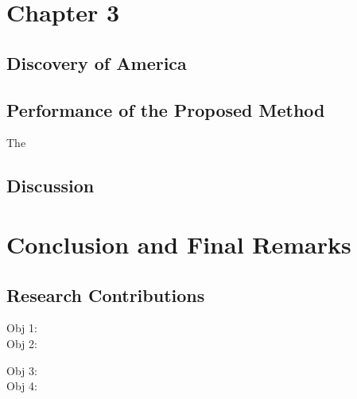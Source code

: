 \documentclass[11pt,a4paper,openright]{book}
\newcommand{\blankpage}{\newpage This page intentionally left blank.}
\theoremstyle{plain}
\theoremstyle{definition}
\begin{document}
\chapter{Chapter 3}\label{ch-ga-eoc}

\lipsum[2]

\section{Discovery of America}
\lipsum[3]


\section{Performance of the Proposed Method}
The\lipsum[3-8]



\section{Discussion}

\lipsum[2-5]




 


\chapter{Conclusion and Final Remarks}\label{ch-concl}

\lipsum[5-9]



\section{Research Contributions}
\lipsum[2]

\begin{description}
\item[Obj 1:] \lipsum[1]


\item[Obj 2:] \lipsum[2]
\end{description}


\lipsum[3]


\begin{description}
\item[Obj 3:] \lipsum[4]

\item[Obj 4:] \lipsum[5]
\end{description}
\end{document}
